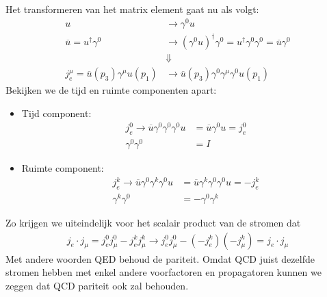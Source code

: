 \documentclass[../main.tex]{subfiles}
\begin{document}
Het transformeren van het matrix element gaat nu als volgt:
\begin{equation}
    \begin{aligned}
        \label{eq:qed_mat_par}
        u &\rightarrow \gamma^0 u\\
        \overline u = u^\dagger \gamma^0 &\rightarrow (\gamma^0u)^\dagger \gamma^0=u^\dagger\gamma^0\gamma^0 = \overline u \gamma^0\\
                                         &\Downarrow\\
        j_e^\mu = \overline u(p_3)\gamma^\mu u(p_1) &\rightarrow \overline u(p_3)\gamma^0\gamma^\mu\gamma^0 u(p_1)
    \end{aligned}
\end{equation}
Bekijken we de tijd en ruimte componenten apart:
\begin{itemize}
    \item Tijd component:
        \begin{equation}
            \begin{aligned}
                \label{eq:qed_mat_par_tijd}
                j_e^0 \rightarrow \overline u\gamma^0\gamma^0\gamma^0 u &= \overline u \gamma^0 u = j_e^0\\
                \gamma^0\gamma^0&=I
            \end{aligned}
        \end{equation}
    \item Ruimte component:
        \begin{equation}
            \begin{aligned}
                \label{eq:qed_mat_par_ruimte}
                j_e^k \rightarrow \overline u\gamma^0\gamma^k\gamma^0 u &= \overline u\gamma^k\gamma^0\gamma^0 u = -j_e^k\\
                \gamma^k\gamma^0&=-\gamma^0\gamma^k
            \end{aligned}
        \end{equation}
\end{itemize}
Zo krijgen we uiteindelijk voor het scalair product van de stromen dat
\begin{equation}
    \begin{aligned}
        \label{eq:qed_stromen_par}
        j_e\cdot j_\mu = j_e^0j_\mu^0 - j_e^kj_\mu^k \rightarrow j_e^0j_\mu^0 - (-j_e^k)(-j_\mu^k) = j_e\cdot j_\mu
    \end{aligned}
\end{equation}
Met andere woorden QED behoud de pariteit. Omdat QCD juist dezelfde stromen hebben met enkel andere voorfactoren en propagatoren kunnen we zeggen dat QCD pariteit ook zal behouden.
\end{document}
